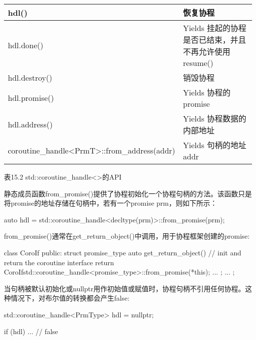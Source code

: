 \begin{longtable}[c]{|l|l|}
hdl()                                                                                  & 恢复协程                                                               \\ \hline
hdl.done()                                                                             & Yields 挂起的协程是否已结束，并且不再允许使用resume() \\ \hline
hdl.destroy()                                                                          & 销毁协程                                                                \\ \hline
hdl.promise()                                                                          & Yields 协程的promise                                                    \\ \hline
hdl.address()                                                                          & Yields 协程数据的内部地址                                     \\ \hline
coroutine\_handle\textless{}PrmT\textgreater{}::from\_address(addr)                    & Yields 句柄的地址addr                                             \\ \hline
\end{longtable}

\begin{center}
表15.2 std::coroutine\_handle<>的API
\end{center}

静态成员函数from\_promise()提供了协程初始化一个协程句柄的方法。该函数只是将promise的地址存储在句柄中，若有一个promise prm，则如下所示：

\begin{cpp}
auto hdl = std::coroutine_handle<decltype(prm)>::from_promise(prm);
\end{cpp}

from\_promise()通常在get\_return\_object()中调用，用于协程框架创建的promise:

\begin{cpp}
class CoroIf {
	public:
	struct promise_type {
		auto get_return_object() { // init and return the coroutine interface
			return CoroIf{std::coroutine_handle<promise_type>::from_promise(*this)};
		}
		...
	};
...
};
\end{cpp}

当句柄被默认初始化或nullptr用作初始值或赋值时，协程句柄不引用任何协程。这种情况下，对布尔值的转换都会产生false:

\begin{cpp}
std::coroutine_handle<PrmType> hdl = nullptr;

if (hdl) ... // false
\end{cpp}

